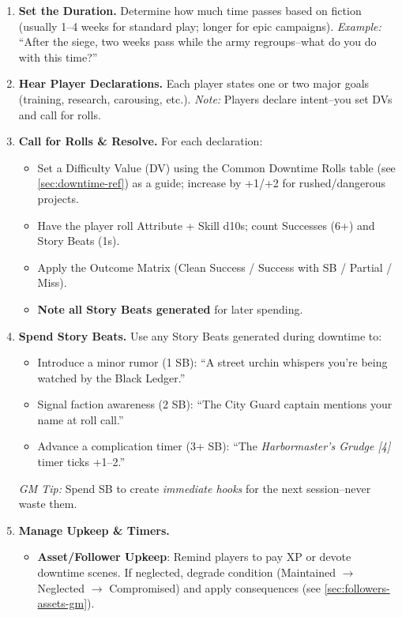 \begin{enumerate}
  \item \textbf{Set the Duration.} 
        Determine how much time passes based on fiction (usually 1--4 weeks for standard play; longer for epic campaigns). 
        \textit{Example:} ``After the siege, two weeks pass while the army regroups--what do you do with this time?''
  \item \textbf{Hear Player Declarations.} 
        Each player states one or two major goals (training, research, carousing, etc.). 
        \textit{Note:} Players declare intent--you set DVs and call for rolls.
  \item \textbf{Call for Rolls \& Resolve.} 
        For each declaration: 
        \begin{itemize}
          \item Set a Difficulty Value (DV) using the Common Downtime Rolls table (see \ref{sec:downtime-ref}) as a guide; increase by +1/+2 for rushed/dangerous projects.
          \item Have the player roll Attribute + Skill d10s; count Successes (6+) and Story Beats (1s).
          \item Apply the Outcome Matrix (Clean Success / Success with SB / Partial / Miss).
          \item \textbf{Note all Story Beats generated} for later spending.
        \end{itemize}
  \item \textbf{Spend Story Beats.} 
        Use any Story Beats generated during downtime to: 
        \begin{itemize}
          \item Introduce a minor rumor (1 SB): ``A street urchin whispers you're being watched by the Black Ledger.''
          \item Signal faction awareness (2 SB): ``The City Guard captain mentions your name at roll call.''
          \item Advance a complication timer (3+ SB): ``The \emph{Harbormaster's Grudge [4]} timer ticks +1--2.''
        \end{itemize}
        \textit{GM Tip:} Spend SB to create \textit{immediate hooks} for the next session--never waste them.
  \item \textbf{Manage Upkeep \& Timers.} 
        \begin{itemize}
          \item \textbf{Asset/Follower Upkeep}: Remind players to pay XP or devote downtime scenes. If neglected, degrade condition (Maintained $\rightarrow$ Neglected $\rightarrow$ Compromised) and apply consequences (see \ref{sec:followers-assets-gm}).

\end{itemize}
\end{enumerate}
